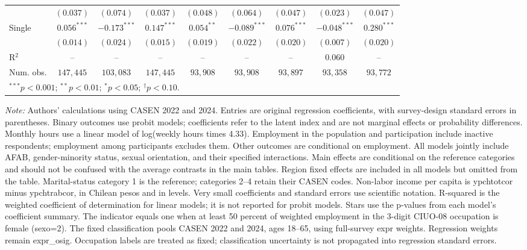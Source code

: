 \begin{table}[htpb]
{\begin{tabular}{l c c c c c c c c}
 & $(0.037)$ & $(0.074)$ & $(0.037)$ & $(0.048)$ & $(0.064)$ & $(0.047)$ & $(0.023)$ & $(0.047)$ \\
Single & $0.056^{***}$ & $-0.173^{***}$ & $0.147^{***}$ & $0.054^{**}$ & $-0.089^{***}$ & $0.076^{***}$ & $-0.048^{***}$ & $0.280^{***}$ \\
 & $(0.014)$ & $(0.024)$ & $(0.015)$ & $(0.019)$ & $(0.022)$ & $(0.020)$ & $(0.007)$ & $(0.020)$ \\
\hline
R$^2$ & -- & -- & -- & -- & -- & -- & $0.060$ & -- \\
Num. obs. & $147,445$ & $103,083$ & $147,445$ & $93,908$ & $93,908$ & $93,897$ & $93,358$ & $93,772$ \\
\hline
\multicolumn{9}{l}{\scriptsize $^{***}p<0.001$; $^{**}p<0.01$; $^{*}p<0.05$; $^{\dagger}p<0.10$.} \\
\end{tabular}%
}
\par\smallskip
\begin{minipage}{\textwidth}\footnotesize\raggedright
\textit{Note:} Authors' calculations using CASEN 2022 and 2024. Entries are original regression coefficients, with survey-design standard errors in parentheses. Binary outcomes use probit models; coefficients refer to the latent index and are not marginal effects or probability differences. Monthly hours use a linear model of log(weekly hours times 4.33). Employment in the population and participation include inactive respondents; employment among participants excludes them. Other outcomes are conditional on employment. All models jointly include AFAB, gender-minority status, sexual orientation, and their specified interactions. Main effects are conditional on the reference categories and should not be confused with the average contrasts in the main tables. Region fixed effects are included in all models but omitted from the table. Marital-status category 1 is the reference; categories 2--4 retain their CASEN codes. Non-labor income per capita is ypchtotcor minus ypchtrabcor, in Chilean pesos and in levels. Very small coefficients and standard errors use scientific notation. R-squared is the weighted coefficient of determination for linear models; it is not reported for probit models. Stars use the p-values from each model's coefficient summary. The indicator equals one when at least 50 percent of weighted employment in the 3-digit CIUO-08 occupation is female (sexo=2). The fixed classification pools CASEN 2022 and 2024, ages 18--65, using full-survey expr weights. Regression weights remain expr\_osig. Occupation labels are treated as fixed; classification uncertainty is not propagated into regression standard errors.
\end{minipage}
\end{table}
